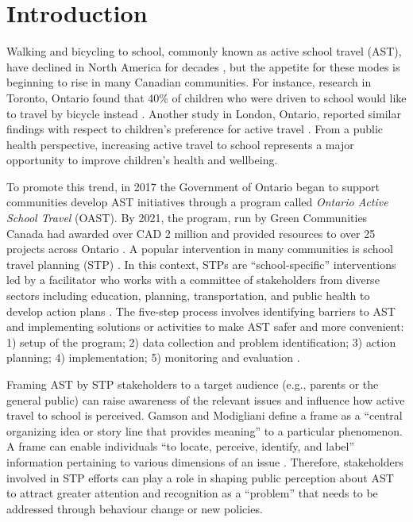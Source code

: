 \documentclass[preprint, 3p,
authoryear]{elsarticle} %
\begin{document}
\newpage

\hypertarget{introduction}{%
\section{Introduction}\label{introduction}}

Walking and bicycling to school, commonly known as active school travel
(AST), have declined in North America for decades
\citep{rothmanDeclineActiveSchool2018}, but the appetite for these modes
is beginning to rise in many Canadian communities. For instance,
research in Toronto, Ontario found that 40\% of children who were driven
to school would like to travel by bicycle instead
\citep{laroucheRatherBikeSchool2016}. Another study in London, Ontario,
reported similar findings with respect to children's preference for
active travel \citep{larsenRouteBasedAnalysisCapture2012}. From a public
health perspective, increasing active travel to school represents a
major opportunity to improve children's health and wellbeing.

To promote this trend, in 2017 the Government of Ontario began to
support communities develop AST initiatives through a program called
\emph{Ontario Active School Travel} (OAST). By 2021, the program, run by
Green Communities Canada had awarded over CAD 2 million and provided
resources to over 25 projects across Ontario
\citep{GreenCommunities2016}. A popular intervention in many communities
is school travel planning (STP) \citep[see][]{GreenCommunitiesProjects}.
In this context, STPs are ``school-specific'' interventions led by a
facilitator who works with a committee of stakeholders from diverse
sectors including education, planning, transportation, and public health
to develop action plans
\citep{buliungSchoolTravelPlanning2011, mammenSchoolTravelPlanning2014}.
The five-step process involves identifying barriers to AST and
implementing solutions or activities to make AST safer and more
convenient: 1) setup of the program; 2) data collection and problem
identification; 3) action planning; 4) implementation; 5) monitoring and
evaluation
\citep{buliungSchoolTravelPlanning2011, langUnderstandingModalChoice2011}.

Framing AST by STP stakeholders to a target audience (e.g., parents or
the general public) can raise awareness of the relevant issues and
influence how active travel to school is perceived. Gamson and
Modigliani \citeyearpar{gamsonChangingCulture1987} define a frame as a
``central organizing idea or story line that provides meaning'' to a
particular phenomenon. A frame can enable individuals ``to locate,
perceive, identify, and label'' information pertaining to various
dimensions of an issue \citep{goffmanFrameAnalysisEssay1974}. Therefore,
stakeholders involved in STP efforts can play a role in shaping public
perception about AST to attract greater attention and recognition as a
``problem'' that needs to be addressed through behaviour change or new
policies.
\end{document}
